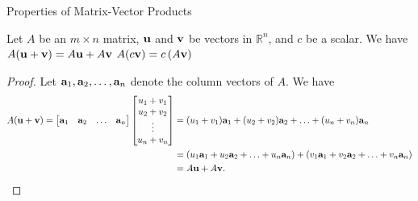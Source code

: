 \documentclass[xcolor=dvipsnames,aspectratio=169,t]{beamer}
\begin{document}
\begin{frame}{Properties of Matrix-Vector Products}

 { \small
  \bbox
  Let $A$ be an $m \times n$ matrix, $\mathbf{u}$ and $\mathbf{v}$ be vectors in $\mathbb{R}^n$, and $c$ be a scalar. We have
  \bi
  \ii $\displaystyle A(\mathbf{u} + \mathbf{v}) = A\mathbf{u} +A \mathbf{v}$
  \ii $\displaystyle A(c \mathbf{v}) = c \left(A \mathbf{v} \right)$
  \ei
  \ebox

  \begin{proof}
    \pause
    Let $\mathbf{a}_1, \mathbf{a}_2, \ldots, \mathbf{a}_n$ denote the column vectors of $A$. We have
    \begin{align*}
      A(\mathbf{u} + \mathbf{v}) 
      = \begin{bmatrix} \mathbf{a}_1 & \mathbf{a}_2 & \ldots & \mathbf{a}_n \end{bmatrix} \begin{bmatrix} u_1+v_1 \\ u_2+v_2 \\ \vdots \\ u_n+v_n \end{bmatrix}
      &= (u_1+v_1) \mathbf{a}_1 + (u_2+v_2) \mathbf{a}_2 + \ldots + (u_n+v_n) \mathbf{a}_n \\
      &= \left( u_1 \mathbf{a}_1 + u_2 \mathbf{a}_2 + \ldots + u_n\mathbf{a}_n \right) +  \left( v_1 \mathbf{a}_1 + v_2 \mathbf{a}_2 + \ldots + v_n\mathbf{a}_n \right) \\
      &= A \mathbf{u} + A \mathbf{v}.\qedhere
    \end{align*}
  \end{proof}
 }
\end{frame}
\end{document}
